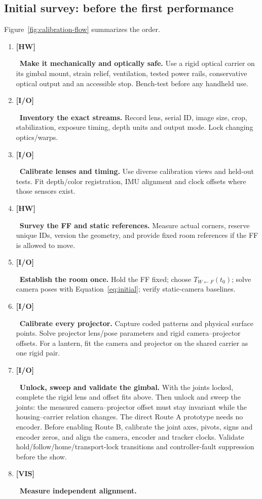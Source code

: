 \documentclass[11pt,a4paper]{article}
\newcommand{\tagHW}{\colorbox{HW!12}{\textcolor{HW}{\strut\textbf{[HW]}}}}
\newcommand{\tagIO}{\colorbox{IO!12}{\textcolor{IO}{\strut\textbf{[I/O]}}}}
\newcommand{\tagVIS}{\colorbox{VIS!12}{\textcolor{VIS}{\strut\textbf{[VIS]}}}}
\newcommand{\T}[2]{T_{#1\leftarrow #2}}
\begin{document}
\subsection{Initial survey: before the first performance}
Figure~\ref{fig:calibration-flow} summarizes the order.
\begin{enumerate}
  \item \tagHW\ \textbf{Make it mechanically and optically safe.}
    Use a rigid optical carrier on its gimbal mount, strain relief,
    ventilation, tested power rails, conservative optical output and an
    accessible stop. Bench-test before any handheld use.
  \item \tagIO\ \textbf{Inventory the exact streams.}
    Record lens, serial ID, image size, crop, stabilization, exposure
    timing, depth units and output mode. Lock changing optics/warps.
  \item \tagIO\ \textbf{Calibrate lenses and timing.}
    Use diverse calibration views and held-out tests. Fit depth/color
    registration, IMU alignment and clock offsets where those sensors exist.
  \item \tagHW\ \textbf{Survey the FF and static references.}
    Measure actual corners, reserve unique IDs, version the geometry, and
    provide fixed room references if the FF is allowed to move.
  \item \tagIO\ \textbf{Establish the room once.}
    Hold the FF fixed; choose $\T{W}{F}(t_0)$; solve camera poses with
    Equation~\eqref{eq:initial}; verify static-camera baselines.
  \item \tagIO\ \textbf{Calibrate every projector.}
    Capture coded patterns and physical surface points. Solve projector
    lens/pose parameters and rigid camera--projector offsets.
    For a lantern, fit the camera and projector on the shared carrier as
    one rigid pair.
  \item \tagIO\ \textbf{Unlock, sweep and validate the gimbal.}
    With the joints locked, complete the rigid lens and offset fits above.
    Then unlock and sweep the joints: the measured camera--projector
    offset must stay invariant while the housing--carrier relation
    changes. The direct Route A prototype needs no encoder. Before
    enabling Route B, calibrate the joint axes, pivots, signs and encoder
    zeros, and align the camera, encoder and tracker clocks. Validate
    hold/follow/home/transport-lock transitions and controller-fault
    suppression before the show.
  \item \tagVIS\ \textbf{Measure independent alignment.}

\end{enumerate}
\end{document}
